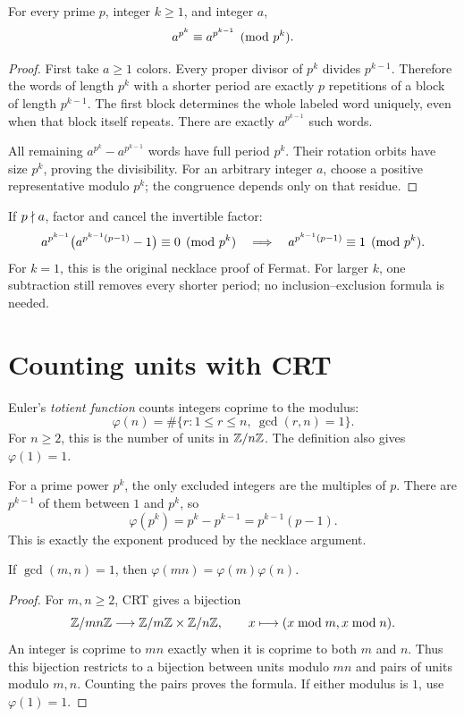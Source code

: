 \begin{proposition}
For every prime $p$, integer $k\ge1$, and integer $a$,
\[
 a^{p^k}\equiv a^{p^{k-1}}\pmod{p^k}.
\]
\end{proposition}
\begin{proof}
First take $a\ge1$ colors. Every proper divisor of $p^k$ divides
$p^{k-1}$. Therefore the words of length $p^k$ with a shorter period
are exactly $p$ repetitions of a block of length $p^{k-1}$.
The first block determines the whole labeled word uniquely, even when
that block itself repeats. There are exactly $a^{p^{k-1}}$ such words.

All remaining $a^{p^k}-a^{p^{k-1}}$ words have full period $p^k$.
Their rotation orbits have size $p^k$, proving the divisibility.
For an arbitrary integer $a$, choose a positive representative modulo
$p^k$; the congruence depends only on that residue.
\end{proof}

If $p\nmid a$, factor and cancel the invertible factor:
\[
 a^{p^{k-1}}\bigl(a^{p^{k-1}(p-1)}-1\bigr)\equiv0\pmod{p^k}
 \quad\Longrightarrow\quad
 a^{p^{k-1}(p-1)}\equiv1\pmod{p^k}.
\]
For $k=1$, this is the original necklace proof of Fermat.
For larger $k$, one subtraction still removes every shorter period;
no inclusion--exclusion formula is needed.

\section{Counting units with CRT}
\label{sec:totient-crt}

\begin{definition}
Euler's \emph{totient function} counts integers coprime to the modulus:
\[
 \varphi(n)=\#\{r:1\le r\le n,\ \gcd(r,n)=1\}.
\]
For $n\ge2$, this is the number of units in $\mathbb Z/n\mathbb Z$.
The definition also gives $\varphi(1)=1$.
\end{definition}

For a prime power $p^k$, the only excluded integers are the multiples
of $p$. There are $p^{k-1}$ of them between $1$ and $p^k$, so
\[
 \varphi(p^k)=p^k-p^{k-1}=p^{k-1}(p-1).
\]
This is exactly the exponent produced by the necklace argument.

\begin{proposition}
If $\gcd(m,n)=1$, then $\varphi(mn)=\varphi(m)\varphi(n)$.
\end{proposition}
\begin{proof}
For $m,n\ge2$, CRT gives a bijection
\[
 \mathbb Z/mn\mathbb Z\longrightarrow\mathbb Z/m\mathbb Z\times\mathbb Z/n\mathbb Z,
 \qquad x\longmapsto(x\bmod m,x\bmod n).
\]
An integer is coprime to $mn$ exactly when it is coprime to both $m$
and $n$. Thus this bijection restricts to a bijection between units
modulo $mn$ and pairs of units modulo $m,n$. Counting the pairs proves
the formula. If either modulus is $1$, use $\varphi(1)=1$.
\end{proof}

